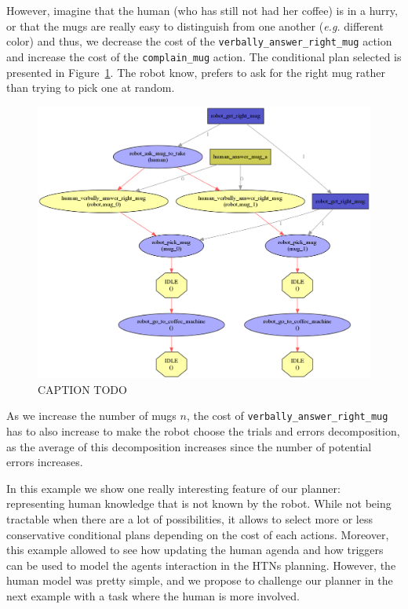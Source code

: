 \documentclass[a4paper,11pt,twoside]{StyleThese}
\begin{document}
However, imagine that the human (who has still not had her coffee) is in a hurry, or that the mugs are really easy to distinguish from one another (\textit{e.g.} different color) and thus, we decrease the cost of the \verb'verbally_answer_right_mug' action and increase the cost of the \verb'complain_mug' action. The conditional plan selected is presented in Figure~\ref{fig:chap4mugask}. The robot know, prefers to ask for the right mug rather than trying to pick one at random.
\begin{figure}[hbtp]
\centering
\includegraphics[width=\textwidth]{figures/chapter4/mug_selection_ask.png}
\caption{CAPTION TODO}
\label{fig:chap4mugask}
\end{figure}

As we increase the number of mugs $n$, the cost of \verb'verbally_answer_right_mug' has to also increase to make the robot choose the trials and errors decomposition, as the average of this decomposition increases since the number of potential errors increases. 



In this example we show one really interesting feature of our planner: representing human knowledge that is not known by the robot. While not being tractable when there are a lot of possibilities, it allows to select more or less conservative conditional plans depending on the cost of each actions. Moreover, this example allowed to see how updating the human agenda and how triggers can be used to model the agents interaction in the HTNs planning.
However, the human model was pretty simple, and we propose to challenge our planner in the next example with a task where the human is more involved.
\end{document}
